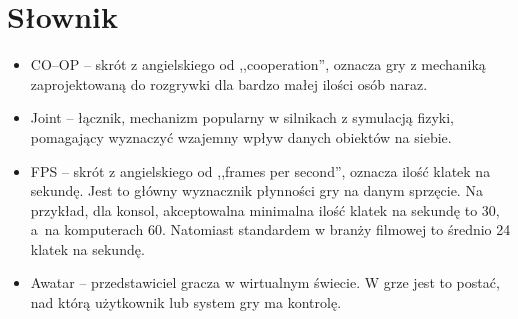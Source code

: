\documentclass[brudnopis]{xmgr}
\begin{document}

\section*{Słownik}
\label{slownik}
\begin{itemize}
\item CO--OP -- skrót z angielskiego od ,,cooperation'', oznacza gry z mechaniką zaprojektowaną do rozgrywki dla bardzo małej ilości osób naraz.

\item Joint -- łącznik, mechanizm popularny w silnikach z symulacją fizyki, pomagający wyznaczyć wzajemny wpływ danych obiektów na siebie.

\item FPS -- skrót z angielskiego od ,,frames per second'', oznacza ilość klatek na sekundę. Jest to główny wyznacznik płynności gry na danym sprzęcie. Na przykład, dla konsol, akceptowalna minimalna ilość klatek na sekundę to 30, a~na komputerach 60. Natomiast standardem w branży filmowej to średnio 24 klatek na sekundę.


\item Awatar -- przedstawiciel gracza w wirtualnym świecie. W grze jest to postać, nad którą użytkownik lub system gry ma kontrolę.

\end{itemize}
\begin{bibdiv}
\begin{biblist}
\label{bib}




\end{biblist}
\end{bibdiv}

\listoftables
\listoffigures
\oswiadczenie
\end{document}
